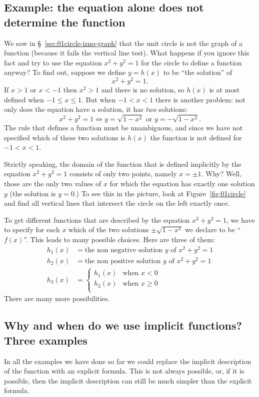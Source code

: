\subsection{Example: the equation alone does not determine the function}
\label{sec:implicit-example-h1h2h3}
We saw in \S~\ref{sec:01circle-izno-graph} that the unit circle is not
the graph of a function (because it fails the vertical line test).
What happens if you ignore this fact and try to use the equation
$x^2+y^2=1$ for the circle to define a function anyway?
To find out, suppose we define $y=h(x)$ to be ``the solution'' of 
\[
x^2 + y^2=1.
\]
If $x>1$ or $x<-1$ then $x^2>1$ and there is no solution, so $h(x)$ is
at most defined when $-1\leq x\leq 1$.  But when $-1<x<1$ there is
another problem: not only does the equation have a solution, it
has \emph{two} solutions:
\[
x^2+y^2=1 \iff y = \sqrt{1-x^2} \text{ or } y=-\sqrt{1-x^2}.
\]
The rule that defines a function must be unambiguous, and since we
have not specified which of these two solutions is $h(x)$ the function
is not defined for $-1<x<1$.

Strictly speaking, the domain of the function that is defined implicitly by
the equation $x^2+y^2=1$ consists of only two points, namely $x=\pm1$.
Why?  Well, those are the only two values of $x$ for which the equation has
exactly one solution $y$ (the solution is $y=0$.)  To see this in the
picture, look at Figure~\ref{fig:01circle} and find all vertical lines that
intersect the circle on the left exactly once.  

To get different functions that are described by the equation $x^2+y^2=1$,
we have to specify for each $x$ which of the two solutions
$\pm\sqrt{1-x^2}$ we declare to be ``$f(x)$''.  This leads to many possible
choices.  Here are three of them:
\begin{align*}
  h_1(x) & = \text{the non negative solution $y$ of } x^2+y^2=1 \\
  h_2(x) & = \text{the non positive solution $y$ of } x^2+y^2=1 \\
  h_3(x) & = 
  \begin{cases}
    h_1(x) & \text{when $x<0$} \\
    h_2(x) & \text{when $x\geq0$} \\
  \end{cases}
\end{align*}
There are many more possibilities.

\subsection{Why and when do we use implicit functions? Three examples}
\label{sec:why-implicit}
In all the examples we have done so far we could replace the implicit
description of the function with an explicit formula.  This is not always
possible, or, if it is possible, then the implicit description can still be much
simpler than the explicit formula.

